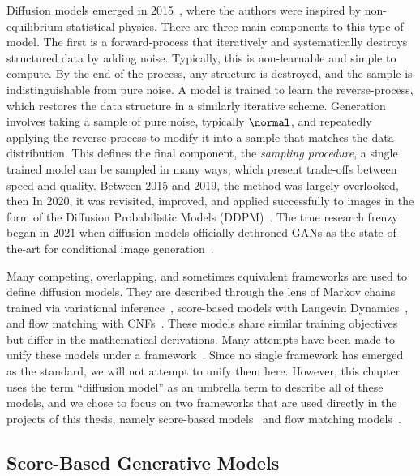 Diffusion models emerged in 2015~\cite{DeepUnsupervisedLearning}, where the authors were inspired by non-equilibrium statistical physics.
There are three main components to this type of model.
The first is a forward-process that iteratively and systematically destroys structured data by adding noise.
Typically, this is non-learnable and simple to compute.
By the end of the process, any structure is destroyed, and the sample is indistinguishable from pure noise.
A model is trained to learn the reverse-process, which restores the data structure in a similarly iterative scheme.
Generation involves taking a sample of pure noise, typically $\normal$,  and repeatedly applying the reverse-process to modify it into a sample that matches the data distribution.
This defines the final component, the \textit{sampling procedure}, a single trained model can be sampled in many ways, which present trade-offs between speed and quality.
Between 2015 and 2019, the method was largely overlooked, then
In 2020, it was revisited, improved, and applied successfully to images in the form of the Diffusion Probabilistic Models (DDPM)~\cite{DDPM}.
The true research frenzy began in 2021 when diffusion models officially dethroned GANs as the state-of-the-art for conditional image generation~\cite{DiffusionBeatsGANS}.

Many competing, overlapping, and sometimes equivalent frameworks are used to define diffusion models.
They are described through the lens of Markov chains trained via variational inference~\cite{DDPM, DDIM}, score-based models with Langevin Dynamics~\cite{ScoreBasedGenerativeModeling, ElucidatingDesignSpace}, and flow matching with CNFs~\cite{BuildingNormalizingFlows, FlowMatchingGenerative, FlowStraightFast}.
These models share similar training objectives but differ in the mathematical derivations.
Many attempts have been made to unify these models under a framework~\cite{CM2, ElucidatingDesignSpace, UnderstandingDiffusionModels, StochasticInterpolants, FlowStraightFast}.
Since no single framework has emerged as the standard, we will not attempt to unify them here.
However, this chapter uses the term ``diffusion model'' as an umbrella term to describe all of these models, and we chose to focus on two frameworks that are used directly in the projects of this thesis, namely score-based models~\cite{ScoreBasedGenerativeModeling} and flow matching models~\cite{BuildingNormalizingFlows, FlowMatchingGenerative, FlowStraightFast}.

\subsection{Score-Based Generative Models}
\label{sec:score_based}

